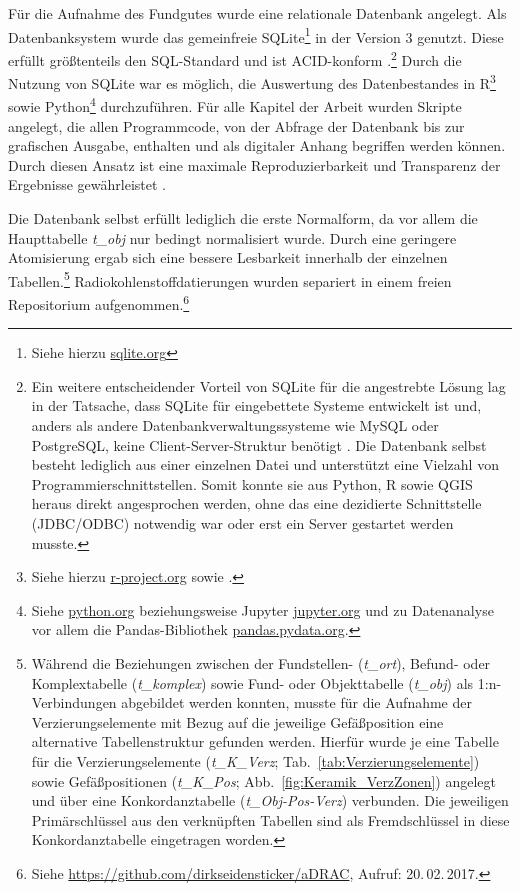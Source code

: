 \begin{multicols}{2}
Für die Aufnahme des Fundgutes wurde eine relationale Datenbank angelegt. Als Datenbanksystem wurde das gemeinfreie SQLite\footnote{Siehe hierzu \url{sqlite.org}} in der Version 3 genutzt. Diese erfüllt größtenteils den SQL-Standard und ist ACID-konform \parencite[299\,f.]{Kemper.2013}.\footnote{Ein weitere entscheidender Vorteil von SQLite für die angestrebte Lösung lag in der Tatsache, dass SQLite für eingebettete Systeme entwickelt ist und, anders als andere Datenbankverwaltungssysteme wie MySQL oder PostgreSQL, keine Client-Server-Struktur benötigt \parencite[siehe][1--6]{Kreibich.2010}. Die Datenbank selbst besteht lediglich aus einer einzelnen Datei und unterstützt eine Vielzahl von Programmierschnittstellen. Somit konnte sie aus Python, R sowie QGIS heraus direkt angesprochen werden, ohne das eine dezidierte Schnittstelle (JDBC/ODBC) notwendig war oder erst ein Server gestartet werden musste.} Durch die Nutzung von SQLite war es möglich, die Auswertung des Datenbestandes in R\footnote{Siehe hierzu \url{r-project.org} sowie \textcite{Tippmann.2015}.}\parencite{RDevelopmentCoreTeam.2008} sowie Python\footnote{Siehe \url{python.org} beziehungsweise Jupyter \url{jupyter.org} und zu Datenanalyse vor allem die Pandas-Bibliothek \url{pandas.pydata.org}.} \parencite{Perez.2007} durchzuführen. Für alle Kapitel der Arbeit wurden Skripte angelegt, die allen Programmcode, von der Abfrage der Datenbank bis zur grafischen Ausgabe, enthalten und als digitaler Anhang begriffen werden können. Durch diesen Ansatz ist eine maximale Reproduzierbarkeit und Transparenz der Ergebnisse gewährleistet \parencite[siehe][]{Marwick.2017}.

Die Datenbank selbst erfüllt lediglich die erste Normalform, da vor allem die Haupttabelle \textit{t\_obj} nur bedingt normalisiert wurde. Durch eine geringere Atomisierung ergab sich eine bessere Lesbarkeit innerhalb der einzelnen Tabellen.\footnote{Während die Beziehungen zwischen der Fundstellen- (\textit{t\_ort}), Befund- oder Komplextabelle (\textit{t\_komplex}) sowie Fund- oder Objekttabelle (\textit{t\_obj}) als 1:n-Verbindungen abgebildet werden konnten, musste für die Aufnahme der Verzierungselemente mit Bezug auf die jeweilige Gefäßposition eine alternative Tabellenstruktur gefunden werden. Hierfür wurde je eine Tabelle für die Verzierungselemente (\textit{t\_K\_Verz}; Tab.~\ref{tab:Verzierungselemente}) sowie Gefäßpositionen (\textit{t\_K\_Pos}; Abb.~\ref{fig:Keramik_VerzZonen}) angelegt und über eine Konkordanztabelle (\textit{t\_Obj-Pos-Verz}) verbunden. Die jeweiligen Primärschlüssel aus den verknüpften Tabellen sind als Fremdschlüssel in diese Konkordanztabelle eingetragen worden.} Radiokohlenstoffdatierungen wurden separiert in einem freien Repositorium aufgenommen.\footnote{Siehe \url{https://github.com/dirkseidensticker/aDRAC}, Aufruf: 20.\,02.\,2017.}
\end{multicols}